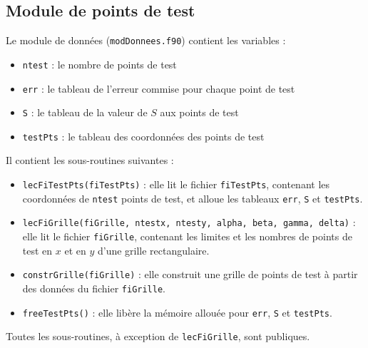\documentclass[12 pt]{article}
\begin{document}
\subsection{Module de points de test}
Le module de données (\texttt{modDonnees.f90}) contient les variables :
\begin{itemize}
	\item \texttt{ntest} : le nombre de points de test
	\item \texttt{err} : le tableau de l'erreur commise pour chaque point de test
	\item \texttt{S} : le tableau de la valeur de $S$ aux points de test
	\item \texttt{testPts} : le tableau des coordonnées des points de test
\end{itemize}
Il contient les sous-routines suivantes :
\begin{itemize} 
	\item \texttt{lecFiTestPts(fiTestPts)} : elle lit le fichier \texttt{fiTestPts}, contenant les coordonnées de \texttt{ntest} points de test, et alloue les tableaux \texttt{err}, \texttt{S} et \texttt{testPts}.
	\item \texttt{lecFiGrille(fiGrille, ntestx, ntesty, alpha, beta, gamma, delta)} : elle lit le fichier \texttt{fiGrille}, contenant les limites et les nombres de points de test en $x$ et en $y$ d'une grille rectangulaire.
	\item \texttt{constrGrille(fiGrille)} : elle construit une grille de points de test à partir des données du fichier \texttt{fiGrille}.
	\item \texttt{freeTestPts()} : elle libère la mémoire allouée pour \texttt{err}, \texttt{S} et \texttt{testPts}.
\end{itemize}
Toutes les sous-routines, à exception de \texttt{lecFiGrille}, sont publiques.
\end{document}
